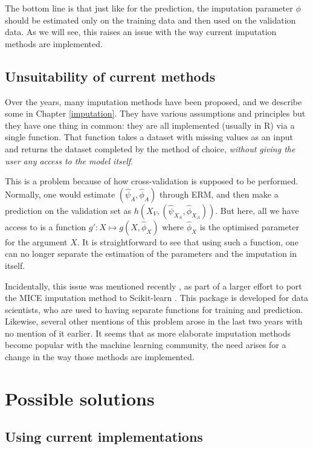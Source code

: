 \documentclass[12pt, a4paper]{memoir}
\begin{document}
The bottom line is that just like for the prediction, the imputation parameter $\phi$ should be estimated only on the training data and then used on the validation data. As we will see, this raises an issue with the way current imputation methods are implemented.

		\subsection{Unsuitability of current methods}
Over the years, many imputation methods have been proposed, and we describe some in Chapter \ref{imputation}. They have various assumptions and principles but they have one thing in common: they are all implemented (usually in R) via a single function. That function takes a dataset with missing values as an input and returns the dataset completed by the method of choice, \emph{without giving the user any access to the model itself}.

This is a problem because of how cross-validation is supposed to be performed. Normally, one would estimate $(\hat{\psi}_A, \hat{\phi}_A)$ through ERM, and then make a prediction on the validation set as $h(X_V,(\hat{\psi}_{X_A},\hat{\phi}_{X_A}))$. But here, all we have access to is a function $g': X \mapsto g(X, \hat{\phi}_X)$ where $\hat{\phi}_X$ is the optimised parameter for the argument $X$. It is straightforward to see that using such a function, one can no longer separate the estimation of the parameters and the imputation in itself.
	
Incidentally, this issue was mentioned recently \cite{github_sklearn}, as part of a larger effort to port the MICE \cite{MICE_founding} imputation method to Scikit-learn \cite{scikit-learn}. This package is developed for data scientists, who are used to having separate functions for training and prediction. Likewise, several other mentions of this problem arose in the last two years \cite{thread_newdata1}\cite{thread_newdata2}\cite{thread_newdata3} with no mention of it earlier. It seems that as more elaborate imputation methods become popular with the machine learning community, the need arises for a change in the way those methods are implemented.
	\section{Possible solutions}
		\subsection{Using current implementations}
\end{document}
